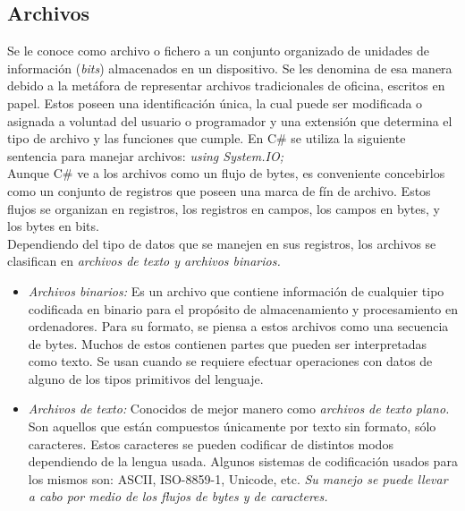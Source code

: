 \documentclass[letterpaper, 12pt]{article}
\begin{document}
\begin{justify}
        \subsection{Archivos}
        Se le conoce como archivo o fichero a un conjunto organizado de unidades de información (\emph{bits}) almacenados en un dispositivo. Se les 
        denomina de esa manera debido a la metáfora de representar archivos tradicionales de oficina, escritos en papel. Estos poseen una identificación
        única, la cual puede ser modificada o asignada a voluntad del usuario o programador y una extensión que determina el tipo de archivo y las funciones que cumple.
        En C\# se utiliza la siguiente sentencia para manejar archivos: \emph{using System.IO;}
        \newline
        \\
        Aunque C\# ve a los archivos como un flujo de bytes, es conveniente concebirlos como un conjunto de registros que poseen una marca de fín de archivo. Estos flujos 
        se organizan en registros, los registros en campos, los campos en bytes, y los bytes en bits.
        \newline
        \\
        Dependiendo del tipo de datos que se manejen en sus registros, los archivos se clasifican en \emph{archivos de texto y archivos binarios.}
        \begin{itemize}
            \item \emph{Archivos binarios: }Es un archivo que contiene información de cualquier tipo codificada en binario para el propósito de almacenamiento y procesamiento en ordenadores.
            Para su formato, se piensa a estos archivos como una secuencia de bytes. Muchos de estos contienen partes que pueden ser interpretadas como texto. Se usan cuando se requiere efectuar operaciones
            con datos de alguno de los tipos primitivos del lenguaje.
            \item \emph{Archivos de texto: }Conocidos de mejor manero como \emph{archivos de texto plano.} Son aquellos que están compuestos únicamente por texto sin formato, sólo caracteres. Estos caracteres
            se pueden codificar de distintos modos dependiendo de la lengua usada. Algunos sistemas de codificación usados para los mismos son: ASCII, ISO-8859-1, Unicode, etc. \emph{Su manejo se puede llevar a cabo
            por medio de los flujos de bytes y de caracteres.}
        \end{itemize}

\end{justify}
\end{document}
